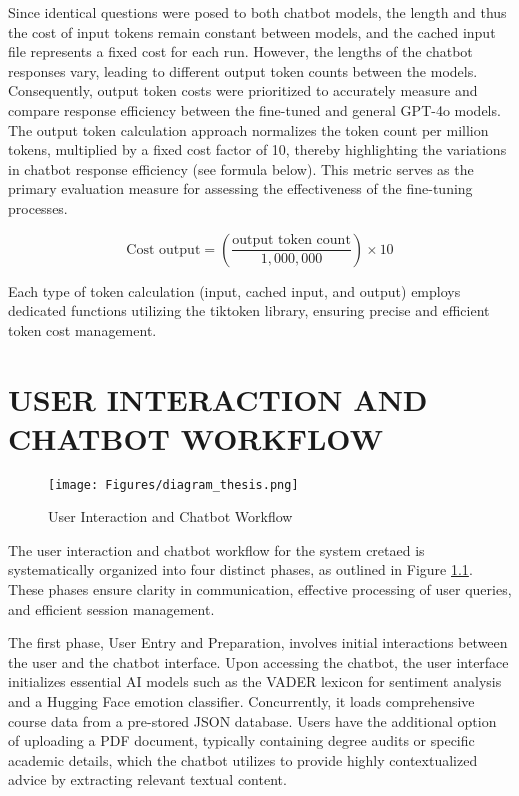\documentclass[12pt,oneside,openany]{report}
\begin{document}
Since identical questions were posed to both chatbot models, the length and thus the cost of input tokens remain constant between models, and the cached input file represents a fixed cost for each run. However, the lengths of the chatbot responses vary, leading to different output token counts between the models. Consequently, output token costs were prioritized to accurately measure and compare response efficiency between the fine-tuned and general GPT-4o models. The output token calculation approach normalizes the token count per million tokens, multiplied by a fixed cost factor of 10, thereby highlighting the variations in chatbot response efficiency (see formula below). This metric serves as the primary evaluation measure for assessing the effectiveness of the fine-tuning processes.

\[
\text{Cost output} = \left(\frac{\text{output token count}}{1,000,000}\right) \times 10
\]

Each type of token calculation (input, cached input, and output) employs dedicated functions utilizing the tiktoken library, ensuring precise and efficient token cost management.

\chapter{USER INTERACTION AND CHATBOT WORKFLOW}

\begin{figure}[H]
    \centering
    \texttt{[image: Figures/diagram\_thesis.png]}
    \caption{User Interaction and Chatbot Workflow}
    \label{fig:chatbot_workflow}
\end{figure}

The user interaction and chatbot workflow for the system cretaed is systematically organized into four distinct phases, as outlined in Figure \ref{fig:chatbot_workflow}. These phases ensure clarity in communication, effective processing of user queries, and efficient session management.

The first phase, User Entry and Preparation, involves initial interactions between the user and the chatbot interface. Upon accessing the chatbot, the user interface initializes essential AI models such as the VADER lexicon for sentiment analysis and a Hugging Face emotion classifier. Concurrently, it loads comprehensive course data from a pre-stored JSON database. Users have the additional option of uploading a PDF document, typically containing degree audits or specific academic details, which the chatbot utilizes to provide highly contextualized advice by extracting relevant textual content.
\end{document}
